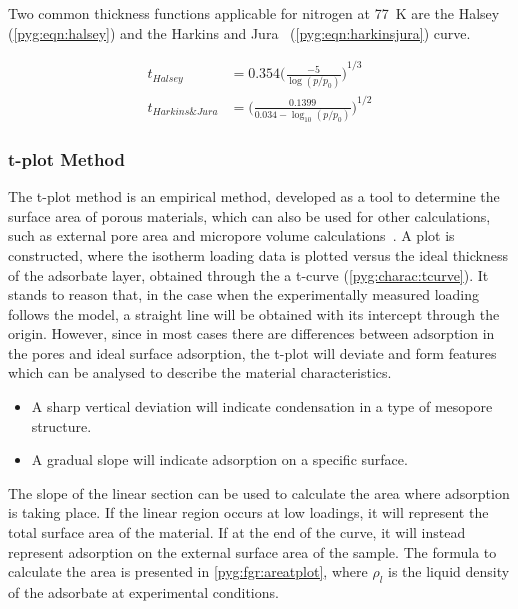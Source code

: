 Two common thickness functions applicable for nitrogen at \SI{77}{\kelvin}
are the Halsey~\cite{halseyPhysicalAdsorptionNon1948}
(\autoref{pyg:eqn:halsey}) and the
Harkins and Jura~\cite{harkinsSurfacesSolidsXIII1944}
(\autoref{pyg:eqn:harkinsjura}) curve.

\begin{align}
	t_{Halsey}        & = 0.354 {\Big(\frac{-5}{\log(p/p_0)}\Big)}^{1/3} \label{pyg:eqn:halsey}                 \\
	t_{Harkins\&Jura} & = {\Big(\frac{0.1399}{0.034 - \log_{10}(p/p_0)}\Big)}^{1/2} \label{pyg:eqn:harkinsjura}
\end{align}


\subsubsection{t-plot Method}\label{pyg:charac:tplot}

The t-plot method is an empirical method, developed as a
tool to determine the surface area of porous materials,
which can also be used for other calculations, such as
external pore area and micropore volume
calculations~\cite{lippensStudiesPoreSystems1965}.
A plot is constructed, where the isotherm loading
data is plotted versus the ideal thickness of the adsorbate layer,
obtained through the a t-curve (\autoref{pyg:charac:tcurve}).
It stands to reason that, in the case when the experimentally measured
loading follows the model, a straight line will be obtained with its
intercept through the origin. However, since in most cases there
are differences between adsorption in the pores and ideal surface
adsorption, the t-plot will deviate and form features which can
be analysed to describe the material characteristics.

\begin{itemize}

	\item A sharp vertical deviation will indicate condensation
	      in a type of mesopore structure.
	\item A gradual slope will indicate adsorption on a specific
	      surface.

\end{itemize}

The slope of the linear section can be used to calculate the area where
adsorption is taking place. If the linear region occurs at low loadings,
it will represent the total surface area of the material.
If at the end of the curve, it will instead represent adsorption on
the external surface area of the sample. The formula to calculate the area
is presented in \autoref{pyg:fgr:areatplot},
where \(\rho_{l}\) is the liquid density of the adsorbate at experimental
conditions.

